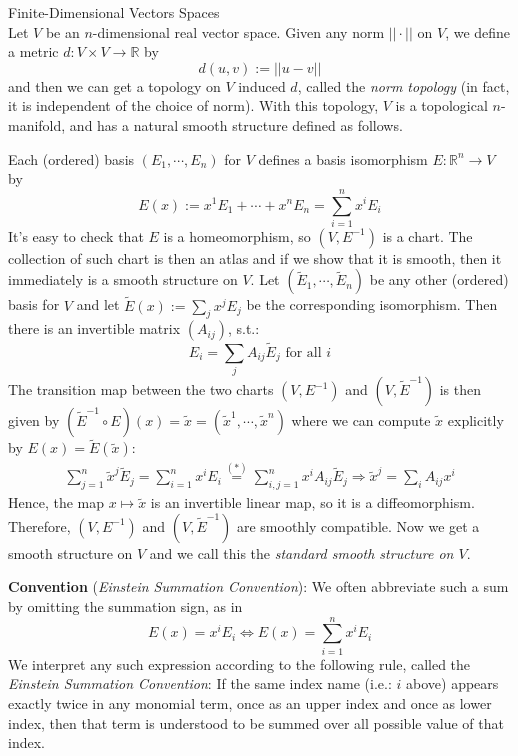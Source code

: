 \begin{example}{Finite-Dimensional Vectors Spaces}\\
Let $V$ be an $n$-dimensional real vector space. Given any norm $||\cdot||$ on $V$, we define a metric $d:V \times V\to \mathbb{R}$ by
\[
d(u,v):= ||u-v||
\]
and then we can get a topology on $V$ induced $d$, called the \textit{norm topology} (in fact, it is independent of the choice of norm). With this topology, $V$ is a topological $n$-manifold, and has a natural smooth structure defined as follows.

Each (ordered) basis $(E_1, \cdots, E_n)$ for $V$ defines a basis isomorphism $E: \mathbb{R}^n \to V$ by
\[
E(x):= x^1E_1 +\cdots +x^nE_n =\sum_{i=1}^n x^iE_i
\]
It's easy to check that $E$ is a homeomorphism, so $(V,E^{-1})$ is a chart. The collection of such chart is then an atlas and if we show that it is smooth, then it immediately is a smooth structure on $V$. Let $(\tilde{E}_1 ,\cdots, \tilde{E}_n)$ be any other (ordered) basis for $V$ and let $\tilde{E}(x):= \sum_{j} x^jE_j$ be the corresponding isomorphism. Then there is an invertible matrix $(A_{ij})$, s.t.:
\begin{equation*}
    E_i=\sum_{j} A_{ij} \tilde{E}_j \text{ for all }i \tag{*}
\end{equation*}
The transition map between the two charts $(V,E^{-1})$ and $(V, \tilde{E}^{-1})$ is then given by $(\tilde{E}^{-1} \circ E) (x)= \tilde{x}= (\tilde{x}^1 ,\cdots, \tilde{x}^n)$ where we can compute $\tilde{x}$ explicitly by $E(x)= \tilde{E}(\tilde{x})$:
\begin{align*}
    \sum_{j=1}^n \tilde{x}^j\tilde{E}_j= \sum_{i=1}^n x^iE_i \overset{(*)}{=} \sum_{i,j=1}^n x^iA_{ij} \tilde{E}_j \Rightarrow \tilde{x}^j= \sum_i A_{ij} x^i
\end{align*}
Hence, the map $x\mapsto \tilde{x}$ is an invertible linear map, so it is a diffeomorphism. Therefore, $(V,E^{-1})$ and $(V,\tilde{E}^{-1})$ are smoothly compatible. Now we get a smooth structure on $V$ and we call this the \textit{standard smooth structure on $V$}.
\end{example}

\noindent\textbf{Convention} (\textit{Einstein Summation Convention}): We often abbreviate such a sum by omitting the summation sign, as in
\[
E(x)=x^iE_i \Leftrightarrow E(x)= \sum_{i=1}^n x^iE_i
\]
We interpret any such expression according to the following rule, called the \textit{Einstein Summation Convention}: If the same index name (i.e.: $i$ above) appears exactly twice in any monomial term, once as an upper index and once as lower index, then that term is understood to be summed over all possible value of that index.

